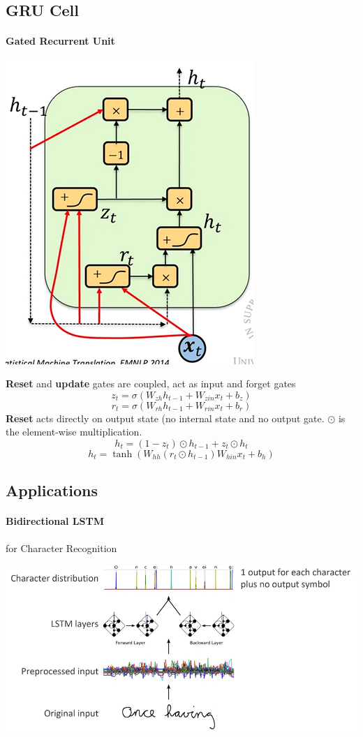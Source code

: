 \documentclass[10pt]{report}
\begin{document}
\subsection{GRU Cell}
\paragraph{Gated Recurrent Unit}\begin{center}
	\includegraphics[scale=0.5]{98.png}
\end{center}
\textbf{Reset} and \textbf{update} gates are coupled, act as input and forget gates 
$$z_t =\sigma(W_{zh}h_{t-1} + W_{zin}x_t + b_z)$$
$$r_t =\sigma(W_{rh}h_{t-1} + W_{rin}x_t + b_r)$$
\textbf{Reset} acts directly on output state (no internal state and no output gate. $\odot$ is the element-wise multiplication.
$$h_t = (1 - z_t)\odot h_{t-1} + z_t\odot h_t$$
$$h_t = \tanh(W_{hh}(r_t\odot h_{t-1}) W_{hin}x_t + b_h)$$
\subsection{Applications}
\paragraph{Bidirectional LSTM} for Character Recognition
\begin{center}
	\includegraphics[scale=0.5]{99.png}
\end{center}
\end{document}
